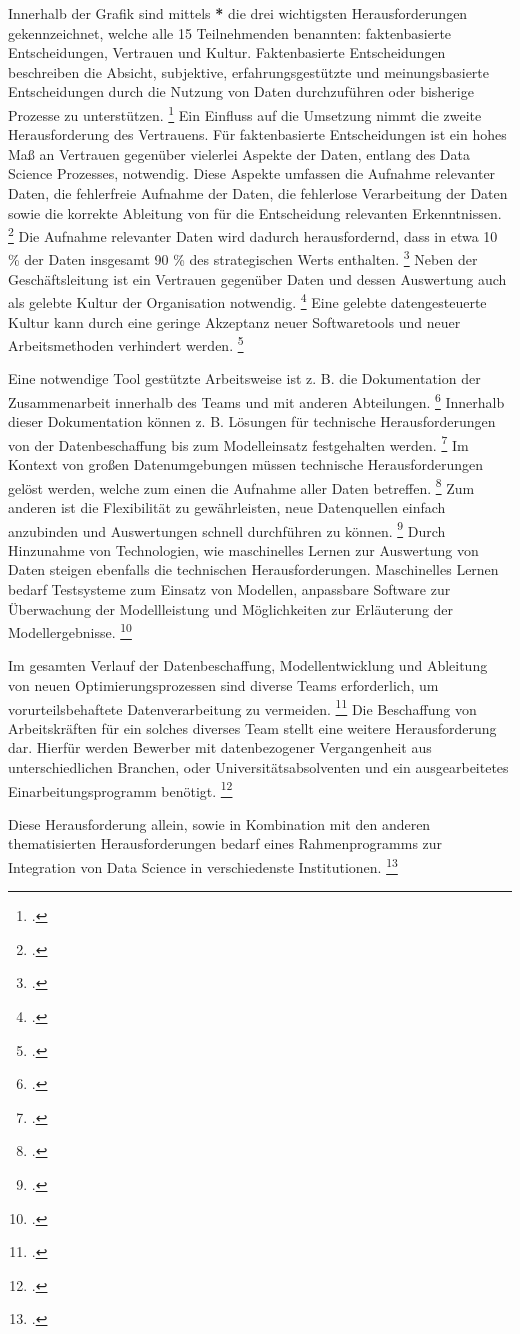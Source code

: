 Innerhalb der Grafik sind mittels \textbf{*} die drei wichtigsten Herausforderungen gekennzeichnet, welche alle 15 Teilnehmenden benannten: faktenbasierte Entscheidungen, Vertrauen und Kultur.
Faktenbasierte Entscheidungen beschreiben die Absicht, subjektive, erfahrungsgestützte und meinungsbasierte Entscheidungen durch die Nutzung von Daten durchzuführen oder bisherige Prozesse zu unterstützen. \footcite[Vgl.][S. 9]{Dalpiaz.2020}
Ein Einfluss auf die Umsetzung nimmt die zweite Herausforderung des Vertrauens.
Für faktenbasierte Entscheidungen ist ein hohes Maß an Vertrauen gegenüber vielerlei Aspekte der Daten, entlang des Data Science Prozesses, notwendig.
Diese Aspekte umfassen die Aufnahme relevanter Daten, die fehlerfreie Aufnahme der Daten, die fehlerlose Verarbeitung der Daten sowie die korrekte Ableitung von für die Entscheidung relevanten Erkenntnissen. \footcite[Vgl.][S. 10]{Dalpiaz.2020}
Die Aufnahme relevanter Daten wird dadurch herausfordernd, dass in etwa 10 \% der Daten insgesamt 90 \% des strategischen Werts enthalten. \footcite[Vgl.][S. 3]{Pratt.2023}
Neben der Geschäftsleitung ist ein Vertrauen gegenüber Daten und dessen Auswertung auch als gelebte Kultur der Organisation notwendig. \footcite[Vgl.][S. 4]{Dalpiaz.2020}
Eine gelebte datengesteuerte Kultur kann durch eine geringe Akzeptanz neuer Softwaretools und neuer Arbeitsmethoden verhindert werden. \footcite[Vgl.][S. 15]{Dalpiaz.2020}

Eine notwendige Tool gestützte Arbeitsweise ist z. B. die Dokumentation der Zusammenarbeit innerhalb des Teams und mit anderen Abteilungen. \footcite[Vgl.][S. 12]{Zhang.2020b}
Innerhalb dieser Dokumentation können z. B. Lösungen für technische Herausforderungen von der Datenbeschaffung bis zum Modelleinsatz festgehalten werden. \footcite[Vgl.][S. 23]{Grossman.2014}
Im Kontext von großen Datenumgebungen müssen technische Herausforderungen gelöst werden, welche zum einen die Aufnahme aller Daten betreffen. \footcite[Vgl.][S. 217]{Elgendy.2014}
Zum anderen ist die Flexibilität zu gewährleisten, neue Datenquellen einfach anzubinden und Auswertungen schnell durchführen zu können. \footcite[Vgl.][S. 217]{Elgendy.2014}
Durch Hinzunahme von Technologien, wie maschinelles Lernen zur Auswertung von Daten steigen ebenfalls die technischen Herausforderungen.
Maschinelles Lernen bedarf Testsysteme zum Einsatz von Modellen, anpassbare Software zur Überwachung der Modellleistung und Möglichkeiten zur Erläuterung der Modellergebnisse. \footcite[Vgl.][S. 1]{Nahar.2022}

Im gesamten Verlauf der Datenbeschaffung, Modellentwicklung und Ableitung von neuen Optimierungsprozessen sind diverse Teams erforderlich, um vorurteilsbehaftete Datenverarbeitung zu vermeiden. \footcite[Vgl.][S. 18]{Zhang.2020b}
Die Beschaffung von Arbeitskräften für ein solches diverses Team stellt eine weitere Herausforderung dar. 
Hierfür werden Bewerber mit datenbezogener Vergangenheit aus unterschiedlichen Branchen, oder Universitätsabsolventen und ein ausgearbeitetes Einarbeitungsprogramm benötigt. \footcite[Vgl.][S. 13]{Patil.2011}

Diese Herausforderung allein, sowie in Kombination mit den anderen thematisierten Herausforderungen bedarf eines Rahmenprogramms zur Integration von Data Science in verschiedenste Institutionen. \footcite[Vgl.][S. 1]{Saltz.2017}
